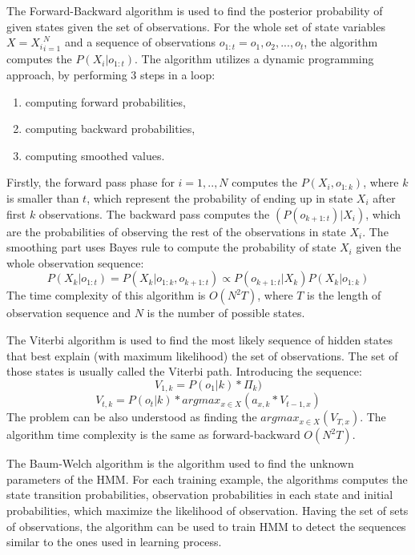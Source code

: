 The Forward-Backward algorithm is used to find the posterior probability of given states given the set of observations.
For the whole set of state variables $X = {X_i}_{i=1}^{N}$ and a sequence of observations $o_{1:t} = o_1, o_2,...,o_t$, the algorithm computes the $P(X_i | o_{1:t})$.
The algorithm utilizes a dynamic programming approach, by performing 3 steps in a loop: 
\begin{enumerate}
\item computing forward probabilities,
\item computing backward probabilities,
\item computing smoothed values.
\end{enumerate}
Firstly, the forward pass phase for $i=1,..,N$ computes the $P(X_i, o_{1:k})$, where $k$ is smaller than $t$, which represent the probability of ending up in state $X_i$ after first $k$ observations. 
The backward pass computes the $(P(o_{k+1:t}) | X_i)$, which are the probabilities of observing the rest of the observations in state $X_i$.
The smoothing part uses Bayes rule to compute the probability of state $X_i$ given the whole observation sequence:
\begin{equation}
P(X_k | o_{1:t}) = P(X_k | o_{1:k}, o_{k+1:t}) \propto P(o_{k+1:t} | X_k) P(X_k | o_{1:k})
\end{equation}
The time complexity of this algorithm is $O(N^2 T)$, where $T$ is the length of observation sequence and $N$ is the number of possible states.

The Viterbi algorithm is used to find the most likely sequence of hidden states that best explain (with maximum likelihood) the set of observations.
The set of those states is usually called the Viterbi path. 
Introducing the sequence:
\begin{equation}
V_{1,k} = P(o_1 | k) * \Pi_k)
\end{equation}
\begin{equation}
V_{t,k} = P(o_t | k) * argmax_{x\in X}(a_{x,k} * V_{t-1,x})
\end{equation}
The problem can be also understood as finding the $argmax_{x\in X}(V_{T,x})$. 
The algorithm time complexity is the same as forward-backward $O(N^2 T)$.

The Baum-Welch algorithm is the algorithm used to find the unknown parameters of the HMM.
For each training example, the algorithms computes the state transition probabilities, observation probabilities in each state and initial probabilities, which maximize the likelihood of observation.
Having the set of sets of observations, the algorithm can be used to train HMM to detect the sequences similar to the ones used in learning process.

